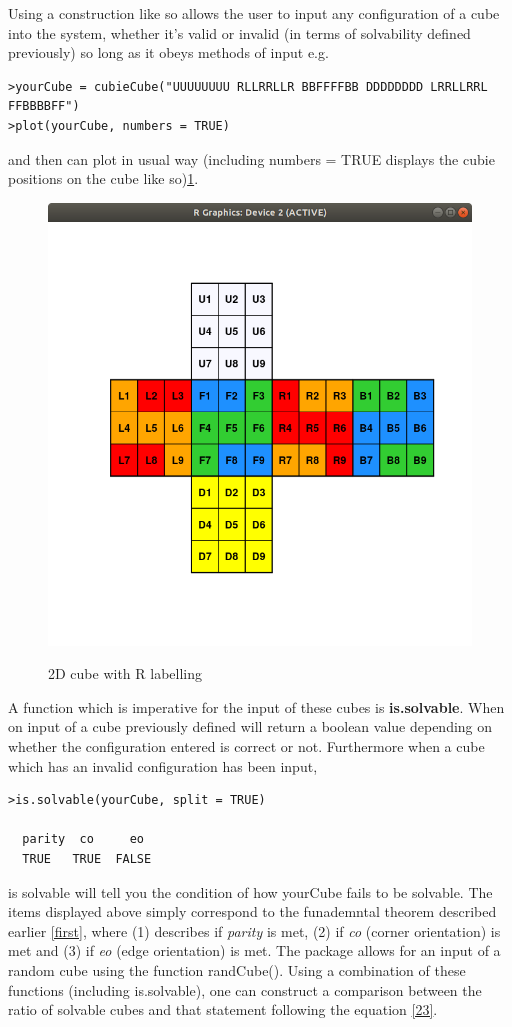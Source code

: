 \documentclass{article}
\begin{document}
\newpage
Using a construction like so allows the user to input any configuration of a cube into the system, whether it's valid or invalid (in terms of solvability defined previously) so long as it obeys methods of input e.g.

\begin{lstlisting}
>yourCube = cubieCube("UUUUUUUU RLLRRLLR BBFFFFBB DDDDDDDD LRRLLRRL FFBBBBFF")
>plot(yourCube, numbers = TRUE)
\end{lstlisting}

and then can plot in usual way (including numbers = TRUE displays the cubie positions on the cube like so)\ref{fig:labelled}.
\begin{figure}[h]
	\centering
	\includegraphics[scale=.5]{labelledcube.png}
	\label{fig:labelled}
	\caption{2D cube with R labelling}
\end{figure}
A function which is imperative for the input of these cubes is \textbf{is.solvable}. When on input of a cube previously defined will return a boolean value depending on whether the configuration entered is correct or not.
Furthermore when a cube which has an invalid configuration has been input, 
\begin{lstlisting}
>is.solvable(yourCube, split = TRUE)

  parity  co     eo
  TRUE   TRUE  FALSE
\end{lstlisting}
is solvable will tell you the condition of how yourCube fails to be solvable. The items displayed above simply correspond to the funademntal theorem described earlier \ref{first}, where (1) describes if \textit{parity} is met, (2) if \textit{co} (corner orientation) is met and (3) if \textit{eo} (edge orientation) is met. \newline The package allows for an input of a random cube using the function randCube(). Using a combination of these functions (including is.solvable), one can construct a comparison between the ratio of solvable cubes and that statement following the equation \ref{23}.
\end{document}
